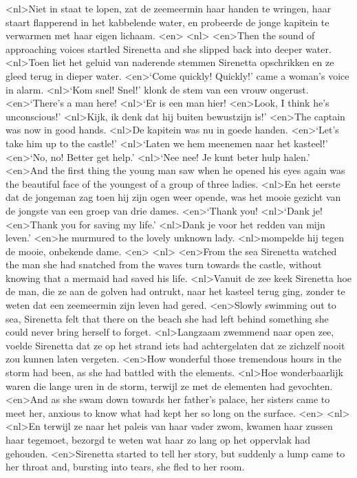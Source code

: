<nl>Niet in staat te lopen, zat de zeemeermin haar handen te wringen, haar staart flapperend in het kabbelende water, en probeerde de jonge kapitein te verwarmen met haar eigen lichaam.
<en>
<nl>
<en>Then the sound of approaching voices startled Sirenetta and she slipped back into deeper water.
<nl>Toen liet het geluid van naderende stemmen Sirenetta opschrikken en ze gleed terug in dieper water.
<en>`Come quickly! Quickly!' came a woman’s voice in alarm.
<nl>`Kom snel! Snel!' klonk de stem van een vrouw ongerust.
<en>`There’s a man here!
<nl>`Er is een man hier!
<en>Look, I think he’s unconscious!' 
<nl>Kijk, ik denk dat hij buiten bewustzijn is!'
<en>The captain was now in good hands.
<nl>De kapitein was nu in goede handen.
<en>`Let’s take him up to the castle!'
<nl>`Laten we hem meenemen naar het kasteel!'
<en>`No, no! Better get help.'
<nl>`Nee nee! Je kunt beter hulp halen.'
<en>And the first thing the young man saw when he opened his eyes again was the beautiful face of the youngest of a group of three ladies.
<nl>En het eerste dat de jongeman zag toen hij zijn ogen weer opende, was het mooie gezicht van de jongste van een groep van drie dames.
<en>`Thank you!
<nl>`Dank je!
<en>Thank you for saving my life.'
<nl>Dank je voor het redden van mijn leven.'
<en>he murmured to the lovely unknown lady.
<nl>mompelde hij tegen de mooie, onbekende dame.
<en>
<nl>
<en>From the sea Sirenetta watched the man she had snatched from the waves turn towards the castle, without knowing that a mermaid had saved his life.
<nl>Vanuit de zee keek Sirenetta hoe de man, die ze aan de golven had ontrukt, naar het kasteel terug ging, zonder te weten dat een zeemeermin zijn leven had gered.
<en>Slowly swimming out to sea, Sirenetta felt that there on the beach she had left behind something she could never bring herself to forget.
<nl>Langzaam zwemmend naar open zee, voelde Sirenetta dat ze op het strand iets had achtergelaten dat ze zichzelf nooit zou kunnen laten vergeten.
<en>How wonderful those tremendous hours in the storm had been, as she had battled with the elements.
<nl>Hoe wonderbaarlijk waren die lange uren in de storm, terwijl ze met de elementen had gevochten.
<en>And as she swam down towards her father’s palace, her sisters came to meet her, anxious to know what had kept her so long on the surface.
<en>
<nl>
<nl>En terwijl ze naar het paleis van haar vader zwom, kwamen haar zussen haar tegemoet, bezorgd te weten wat haar zo lang op het oppervlak had gehouden.
<en>Sirenetta started to tell her story, but suddenly a lump came to her throat and, bursting into tears, she fled to her room.
